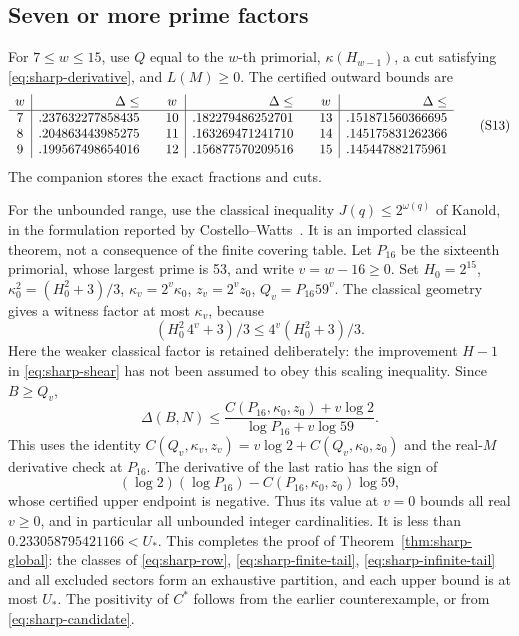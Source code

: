 \documentclass[11pt]{article}
\theoremstyle{definition}\newtheorem{definition}[theorem]{Definition}
\theoremstyle{remark}\newtheorem{remark}[theorem]{Remark}
\begin{document}
\subsection{Seven or more prime factors}
For \(7\le w\le15\), use \(Q\) equal to the \(w\)-th primorial,
\(\kappa(H_{w-1})\), a cut satisfying \eqref{eq:sharp-derivative},
and \(L(M)\ge0\). The certified outward bounds are
\[
\begin{array}{c|r@{\qquad}c|r@{\qquad}c|r}
 w&\Delta\le&w&\Delta\le&w&\Delta\le\\ \hline
 7&.237632277858435&10&.182279486252701&13&.151871560366695\\
 8&.204863443985275&11&.163269471241710&14&.145175831262366\\
 9&.199567498654016&12&.156877570209516&15&.145447882175961
\end{array}                                                         \tag{S13}\label{eq:sharp-finite-tail}
\]
The companion stores the exact fractions and cuts.

For the unbounded range, use the classical inequality
\(J(q)\le2^{\omega(q)}\) of Kanold, in the formulation reported by
Costello--Watts~\cite[Introduction]{CostelloWatts}.
It is an imported classical theorem, not a consequence of the finite
covering table. Let \(P_{16}\) be the sixteenth primorial, whose largest
prime is 53, and write \(v=w-16\ge0\).
Set \(H_0=2^{15}\),
\(\kappa_0^2=(H_0^2+3)/3\),
\(\kappa_v=2^v\kappa_0\), \(z_v=2^v z_0\),
\(Q_v=P_{16}59^v\).
The classical geometry gives a witness factor at most \(\kappa_v\),
because
\[
 (H_0^2\,4^v+3)/3\le4^v(H_0^2+3)/3 .
\]
Here the weaker classical factor is retained deliberately: the
improvement \(H-1\) in \eqref{eq:sharp-shear} has not been assumed
to obey this scaling inequality.
Since \(B\ge Q_v\),
\[
 \Delta(B,N)\le
 \frac{C(P_{16},\kappa_0,z_0)+v\log2}
 {\log P_{16}+v\log59}.                                              \tag{S14}\label{eq:sharp-infinite-tail}
\]
This uses the identity
\(C(Q_v,\kappa_v,z_v)=v\log2+C(Q_v,\kappa_0,z_0)\)
and the real-\(M\) derivative check at \(P_{16}\).
The derivative of the last ratio has the sign of
\[
 (\log2)(\log P_{16})-C(P_{16},\kappa_0,z_0)\log59 ,
\]
whose certified upper endpoint is negative.
Thus its value at \(v=0\) bounds all real \(v\ge0\), and in particular
all unbounded integer cardinalities. It is less than
\(0.233058795421166<U_*\).
This completes the proof of Theorem~\ref{thm:sharp-global}:
the classes of \eqref{eq:sharp-row}, \eqref{eq:sharp-finite-tail},
\eqref{eq:sharp-infinite-tail} and all excluded sectors form an
exhaustive partition, and each upper bound is at most \(U_*\).
The positivity of \(C^*\) follows from the earlier counterexample,
or from \eqref{eq:sharp-candidate}.
\medskip
\end{document}
